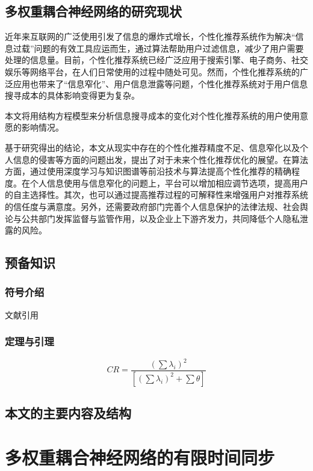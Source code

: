 \documentclass[a4paper,zihao=-4,UTF8]{ctexart}
\numberwithin{equation}{section}
\begin{document}
	\subsection{多权重耦合神经网络的研究现状}
	近年来互联网的广泛使用引发了信息的爆炸式增长，个性化推荐系统作为解决“信息过载”问题的有效工具应运而生，通过算法帮助用户过滤信息，减少了用户需要处理的信息量。目前，个性化推荐系统已经广泛应用于搜索引擎、电子商务、社交娱乐等网络平台，在人们日常使用的过程中随处可见。然而，个性化推荐系统的广泛应用也带来了“信息窄化”、用户信息泄露等问题，个性化推荐系统对于用户信息搜寻成本的具体影响变得更为复杂。
	
	本文将用结构方程模型来分析信息搜寻成本的变化对个性化推荐系统的用户使用意愿的影响情况。
	
	基于研究得出的结论，本文从现实中存在的个性化推荐精度不足、信息窄化以及个人信息的侵害等方面的问题出发，提出了对于未来个性化推荐优化的展望。在算法方面，通过使用深度学习与知识图谱等前沿技术与算法提高个性化推荐的精确程度。在个人信息使用与信息窄化的问题上，平台可以增加相应调节选项，提高用户的自主选择性。其次，也可以通过提高推荐过程的可解释性来增强用户对推荐系统的信任度与满意度。另外，还需要政府部门完善个人信息保护的法律法规、社会舆论与公共部门发挥监督与监管作用，以及企业上下游齐发力，共同降低个人隐私泄露的风险。
	\subsection{预备知识}
		\subsubsection{符号介绍}
		文献引用\cite{孙鲁平2016网上个性化推荐研究述评与展望}
		\subsubsection{定理与引理}
		\begin{equation}
			CR=\frac{\left (  \sum \lambda _{i}\right )^{2}}{\left [\left (  \sum \lambda _{i}\right )^{2}+\sum \theta   \right ]}
		\end{equation}
\subsection{本文的主要内容及结构}

\newpage
\section{多权重耦合神经网络的有限时间同步}
\end{document}
